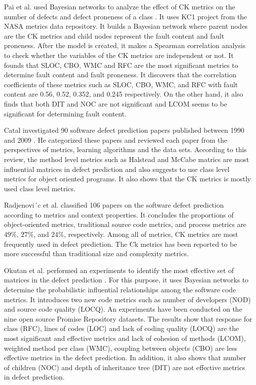 \documentclass[12pt]{report}
\begin{document}
Pai et al. used Bayesian networks to analyze the effect of CK metrics \cite{chidamber1994metrics} on the number of defects and defect proneness of a class \cite{pai2007empirical}. It uses KC1 project from the NASA metrics data repository. It builds a Bayesian network where parent nodes are the CK metrics \cite{chidamber1994metrics} and child nodes represent the fault content and fault proneness. After the model is created, it makes a Spearman correlation analysis to check whether the variables of the CK metrics are independent or not. It founds that SLOC, CBO, WMC and RFC are the most significant metrics to determine fault content and fault proneness. It discovers that the correlation coefficients of these metrics such as SLOC, CBO, WMC, and RFC with fault content are 0.56, 0.52, 0.352, and 0.245 respectively. On the other hand, it also finds that both DIT and NOC are not significant and LCOM seems to be significant for determining fault content.
   
Catal investigated 90 software defect prediction papers published between 1990 and 2009 \cite{catal2009systematic}. He categorized these papers and reviewed each paper from the perspectives of metrics, learning algorithms and the data sets. According to this review, the method level metrics such as Halstead and McCabe matrics are most influential matrices in defect prediction and also suggests to use class level metrics for object oriented programs. It also shows that the CK metrics is mostly used class level metrics. 
 
Radjenovi´c et al. \cite{radjenovic2013software} classified 106 papers on the software defect prediction according to metrics and context properties. It concludes the proportions of object-oriented metrics, traditional source code metrics, and process metrics are $49\%$, $27\%$, and $24\%$, respectively. Among all of metrics, CK \cite{chidamber1994metrics} metrics are most frequently used in defect prediction. The Ck metrics has been reported to be more successful than traditional size and complexity metrics. 

Okutan et al. performed an experiments to identify the most effective set of matrices in the defect prediction \cite{okutan2014software}. For this purpose, it uses Bayesian networks to determine the probabilistic influential relationships among the software code metrics. It introduces two new code metrics such as number of developers (NOD) and source code quality (LOCQ). An experiments have been conducted on the nine open source Promise Repository \cite{promise12} datasets. The results show that response for class (RFC), lines of codes (LOC) and lack of coding quality (LOCQ) are the most significant and effective metrics and lack of cohesion of methods (LCOM), weighted method per class (WMC),  coupling between objects (CBO) are less effective metrics in the defect prediction. In addition, it also shows that number of children (NOC) and depth of inheritance tree (DIT) are not effective metrics in defect prediction. 
\end{document}
